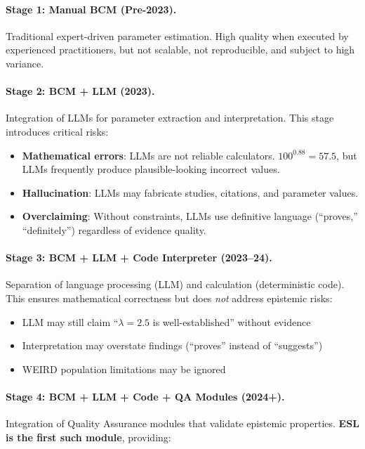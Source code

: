 \documentclass[11pt,a4paper]{article}
\begin{document}
\paragraph{Stage 1: Manual BCM (Pre-2023).}
Traditional expert-driven parameter estimation. High quality when executed
by experienced practitioners, but not scalable, not reproducible, and subject
to high variance.

\paragraph{Stage 2: BCM + LLM (2023).}
Integration of LLMs for parameter extraction and interpretation. This stage
introduces critical risks:

\begin{itemize}
    \item \textbf{Mathematical errors}: LLMs are not reliable calculators.
    $100^{0.88} = 57.5$, but LLMs frequently produce plausible-looking
    incorrect values.
    \item \textbf{Hallucination}: LLMs may fabricate studies, citations,
    and parameter values.
    \item \textbf{Overclaiming}: Without constraints, LLMs use definitive
    language (``proves,'' ``definitely'') regardless of evidence quality.
\end{itemize}

\paragraph{Stage 3: BCM + LLM + Code Interpreter (2023--24).}
Separation of language processing (LLM) and calculation (deterministic code).
This ensures mathematical correctness but does \textit{not} address
epistemic risks:

\begin{itemize}
    \item LLM may still claim ``$\lambda = 2.5$ is well-established'' without
    evidence
    \item Interpretation may overstate findings (``proves'' instead of
    ``suggests'')
    \item WEIRD population limitations may be ignored
\end{itemize}

\paragraph{Stage 4: BCM + LLM + Code + QA Modules (2024+).}
Integration of Quality Assurance modules that validate epistemic properties.
\textbf{ESL is the first such module}, providing:
\end{document}
